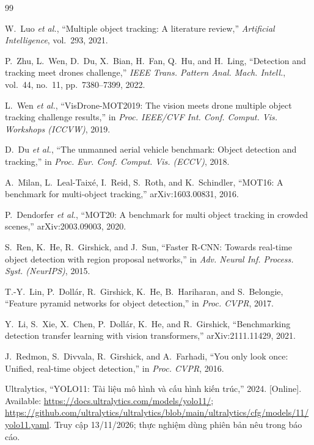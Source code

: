 \documentclass[fontsize=13pt,a4paper,oneside,parskip=false,numbers=noenddot,bibliography=totoc]{scrreprt}
\begin{document}
\begin{thebibliography}{99}
\small

W.~Luo \textit{et al.}, ``Multiple object tracking: A literature review,'' \textit{Artificial Intelligence}, vol.~293, 2021.

P.~Zhu, L.~Wen, D.~Du, X.~Bian, H.~Fan, Q.~Hu, and H.~Ling, ``Detection and tracking meet drones challenge,'' \textit{IEEE Trans. Pattern Anal. Mach. Intell.}, vol.~44, no.~11, pp.~7380--7399, 2022.

L.~Wen \textit{et al.}, ``VisDrone-MOT2019: The vision meets drone multiple object tracking challenge results,'' in \textit{Proc. IEEE/CVF Int. Conf. Comput. Vis. Workshops (ICCVW)}, 2019.

D.~Du \textit{et al.}, ``The unmanned aerial vehicle benchmark: Object detection and tracking,'' in \textit{Proc. Eur. Conf. Comput. Vis. (ECCV)}, 2018.

A.~Milan, L.~Leal-Taixé, I.~Reid, S.~Roth, and K.~Schindler, ``MOT16: A benchmark for multi-object tracking,'' arXiv:1603.00831, 2016.

P.~Dendorfer \textit{et al.}, ``MOT20: A benchmark for multi object tracking in crowded scenes,'' arXiv:2003.09003, 2020.

S.~Ren, K.~He, R.~Girshick, and J.~Sun, ``Faster R-CNN: Towards real-time object detection with region proposal networks,'' in \textit{Adv. Neural Inf. Process. Syst. (NeurIPS)}, 2015.

T.-Y.~Lin, P.~Dollár, R.~Girshick, K.~He, B.~Hariharan, and S.~Belongie, ``Feature pyramid networks for object detection,'' in \textit{Proc. CVPR}, 2017.

Y.~Li, S.~Xie, X.~Chen, P.~Dollár, K.~He, and R.~Girshick, ``Benchmarking detection transfer learning with vision transformers,'' arXiv:2111.11429, 2021.

J.~Redmon, S.~Divvala, R.~Girshick, and A.~Farhadi, ``You only look once: Unified, real-time object detection,'' in \textit{Proc. CVPR}, 2016.

Ultralytics, ``YOLO11: Tài liệu mô hình và cấu hình kiến trúc,'' 2024. [Online]. Available: \url{https://docs.ultralytics.com/models/yolo11/}; \url{https://github.com/ultralytics/ultralytics/blob/main/ultralytics/cfg/models/11/yolo11.yaml}. Truy cập 13/11/2026; thực nghiệm dùng phiên bản nêu trong báo cáo.


\end{thebibliography}
\end{document}
